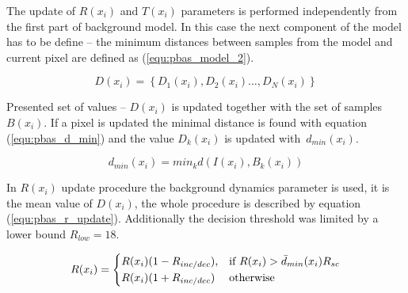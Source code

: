 \documentclass[b5paper,10pt,twoside]{article}
\begin{document}
{The update of $R(x_i)$ and $T(x_i)$ parameters is performed independently from the first part of background model. In this case the next component of the model has to be define -- the minimum distances between samples from the model and current pixel are defined as (\ref{equ:pbas_model_2}).

 
	\begin{equation}
		D(x_i)= \left\{ D_1(x_i), D_2(x_i) \dotsc, D_N(x_i) \right\}
	\label{equ:pbas_model_2}	
	\end{equation}

Presented set of values -- $D(x_i)$ is updated together with the set of samples $B(x_i)$. If a pixel is updated the minimal distance is found with equation (\ref{equ:pbas_d_min}) and the value $D_k(x_i)$ is updated with~$d_{min}(x_i)$.  

	
	\begin{equation}
		d_{min}(x_i) = min_k d(I(x_i), B_k(x_i))
	\label{equ:pbas_d_min}	
	\end{equation}

In $R(x_i)$ update procedure the background dynamics parameter is used, it is the mean value of $D(x_i)$, the whole procedure is described by equation (\ref{equ:pbas_r_update}). Additionally the decision threshold was limited by a lower bound $R_{low} = 18$.

    
    \begin{equation}
	    R(x_i) = 
		\begin{dcases}
    		R(x_i)(1-R_{inc/dec}), & \text{if } R(x_i) > \bar{d}_{min}(x_i)R_{sc} \\
    		R(x_i)(1+R_{inc/dec}) & \text{otherwise} 
		\end{dcases}
	\label{equ:pbas_r_update}	
	\end{equation}

}
\end{document}
